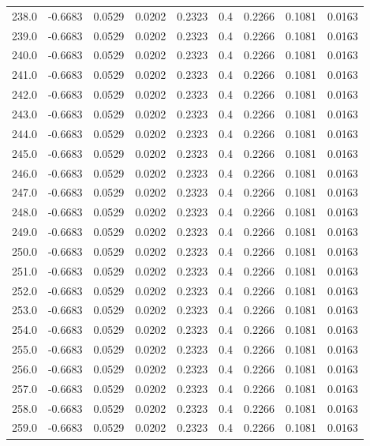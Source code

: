 \begin{longtable}{lrrrrrrrr}
238.0 & -0.6683 & 0.0529 & 0.0202 & 0.2323 & 0.4 & 0.2266 & 0.1081 & 0.0163 \\
239.0 & -0.6683 & 0.0529 & 0.0202 & 0.2323 & 0.4 & 0.2266 & 0.1081 & 0.0163 \\
240.0 & -0.6683 & 0.0529 & 0.0202 & 0.2323 & 0.4 & 0.2266 & 0.1081 & 0.0163 \\
241.0 & -0.6683 & 0.0529 & 0.0202 & 0.2323 & 0.4 & 0.2266 & 0.1081 & 0.0163 \\
242.0 & -0.6683 & 0.0529 & 0.0202 & 0.2323 & 0.4 & 0.2266 & 0.1081 & 0.0163 \\
243.0 & -0.6683 & 0.0529 & 0.0202 & 0.2323 & 0.4 & 0.2266 & 0.1081 & 0.0163 \\
244.0 & -0.6683 & 0.0529 & 0.0202 & 0.2323 & 0.4 & 0.2266 & 0.1081 & 0.0163 \\
245.0 & -0.6683 & 0.0529 & 0.0202 & 0.2323 & 0.4 & 0.2266 & 0.1081 & 0.0163 \\
246.0 & -0.6683 & 0.0529 & 0.0202 & 0.2323 & 0.4 & 0.2266 & 0.1081 & 0.0163 \\
247.0 & -0.6683 & 0.0529 & 0.0202 & 0.2323 & 0.4 & 0.2266 & 0.1081 & 0.0163 \\
248.0 & -0.6683 & 0.0529 & 0.0202 & 0.2323 & 0.4 & 0.2266 & 0.1081 & 0.0163 \\
249.0 & -0.6683 & 0.0529 & 0.0202 & 0.2323 & 0.4 & 0.2266 & 0.1081 & 0.0163 \\
250.0 & -0.6683 & 0.0529 & 0.0202 & 0.2323 & 0.4 & 0.2266 & 0.1081 & 0.0163 \\
251.0 & -0.6683 & 0.0529 & 0.0202 & 0.2323 & 0.4 & 0.2266 & 0.1081 & 0.0163 \\
252.0 & -0.6683 & 0.0529 & 0.0202 & 0.2323 & 0.4 & 0.2266 & 0.1081 & 0.0163 \\
253.0 & -0.6683 & 0.0529 & 0.0202 & 0.2323 & 0.4 & 0.2266 & 0.1081 & 0.0163 \\
254.0 & -0.6683 & 0.0529 & 0.0202 & 0.2323 & 0.4 & 0.2266 & 0.1081 & 0.0163 \\
255.0 & -0.6683 & 0.0529 & 0.0202 & 0.2323 & 0.4 & 0.2266 & 0.1081 & 0.0163 \\
256.0 & -0.6683 & 0.0529 & 0.0202 & 0.2323 & 0.4 & 0.2266 & 0.1081 & 0.0163 \\
257.0 & -0.6683 & 0.0529 & 0.0202 & 0.2323 & 0.4 & 0.2266 & 0.1081 & 0.0163 \\
258.0 & -0.6683 & 0.0529 & 0.0202 & 0.2323 & 0.4 & 0.2266 & 0.1081 & 0.0163 \\
259.0 & -0.6683 & 0.0529 & 0.0202 & 0.2323 & 0.4 & 0.2266 & 0.1081 & 0.0163 \\

\end{longtable}
